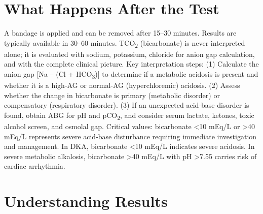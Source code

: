 \section*{What Happens After the Test}
A bandage is applied and can be removed after 15--30 minutes. Results are typically available in 30--60 minutes. TCO\textsubscript{2} (bicarbonate) is never interpreted alone; it is evaluated with sodium, potassium, chloride for anion gap calculation, and with the complete clinical picture. Key interpretation steps: (1) Calculate the anion gap [Na -- (Cl + HCO\textsubscript{3})] to determine if a metabolic acidosis is present and whether it is a high-AG or normal-AG (hyperchloremic) acidosis. (2) Assess whether the change in bicarbonate is primary (metabolic disorder) or compensatory (respiratory disorder). (3) If an unexpected acid-base disorder is found, obtain ABG for pH and pCO\textsubscript{2}, and consider serum lactate, ketones, toxic alcohol screen, and osmolal gap. Critical values: bicarbonate <10 mEq/L or >40 mEq/L represents severe acid-base disturbance requiring immediate investigation and management. In DKA, bicarbonate <10 mEq/L indicates severe acidosis. In severe metabolic alkalosis, bicarbonate >40 mEq/L with pH >7.55 carries risk of cardiac arrhythmia.

\section*{Understanding Results}

